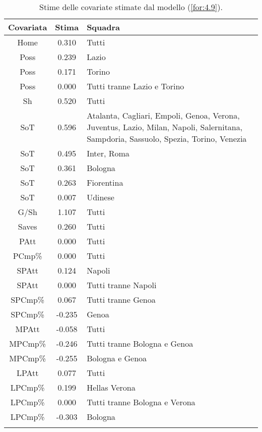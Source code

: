 \begin{table}[!htbp]
	
	\renewcommand{\arraystretch}{1.7}
	\centering
	\begin{tabular}{ccp{10cm}}
		\hline	
		\rowcolor{SchoolColor2}
		\textbf{Covariata} & \textbf{Stima} & \textbf{Squadra} \\	
		\hline
		Home & 0.310 & Tutti\\
		Poss & 0.239 & Lazio \\
		Poss & 0.171 & Torino\\
		Poss & 0.000 & Tutti tranne Lazio e Torino\\
		Sh & 0.520 & Tutti \\
		SoT & 0.596 & Atalanta, Cagliari, Empoli, Genoa, Verona, Juventus, Lazio, Milan, Napoli, Salernitana, Sampdoria, Sassuolo, Spezia, Torino, Venezia\\
		SoT & 0.495 & Inter, Roma \\
		SoT & 0.361 & Bologna \\
		SoT & 0.263 & Fiorentina\\
		SoT & 0.007 & Udinese \\
		G/Sh & 1.107 & Tutti \\
		Saves & 0.260 & Tutti \\
		PAtt & 0.000 & Tutti \\
		PCmp\% & 0.000 & Tutti \\
		SPAtt & 0.124 & Napoli \\
		SPAtt & 0.000 & Tutti tranne Napoli \\
		SPCmp\% & 0.067 & Tutti tranne Genoa \\ 
		SPCmp\% & -0.235 & Genoa \\	
		MPAtt & -0.058 & Tutti \\ 
		MPCmp\% & -0.246 & Tutti tranne Bologna e Genoa \\
		MPCmp\% & -0.255 & Bologna e Genoa \\
		LPAtt & 0.077 & Tutti \\
		LPCmp\% & 0.199 & Hellas Verona \\
		LPCmp\% & 0.000 & Tutti tranne Bologna e Verona \\
		LPCmp\% & -0.303 & Bologna \\	     		   		    
		\hline
		& &  \\
		
	\end{tabular} \hbox{}
	\caption{Stime delle covariate stimate dal modello (\ref{for:4.9}).} \label{tab:BTCL2} 
	
\end{table}
